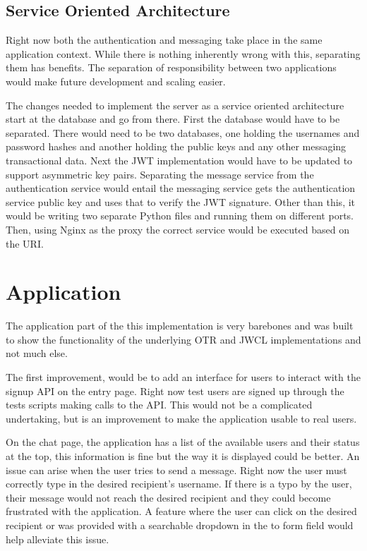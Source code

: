 \subsection{Service Oriented Architecture}


Right now both the authentication and messaging take place in the same application context. While there is nothing inherently wrong with this, separating them has benefits. The separation of responsibility between two applications would make future development and scaling easier. 


The changes needed to implement the server as a service oriented architecture start at the database and go from there. First the database would have to be separated. There would need to be two databases, one holding the usernames and password hashes and another holding the public keys and any other messaging transactional data. Next the JWT implementation would have to be updated to support asymmetric key pairs. Separating the message service from the authentication service would entail the messaging service gets the authentication service public key and uses that to verify the JWT signature. Other than this, it would be writing two separate Python files and running them on different ports. Then, using Nginx as the proxy the correct service would be executed based on the URI. 


\section{Application}


The application part of the this implementation is very barebones and was built to show the functionality of the underlying OTR and JWCL implementations and not much else. 


The first improvement, would be to add an interface for users to interact with the signup API on the entry page. Right now test users are signed up through the tests scripts making calls to the API. This would not be a complicated undertaking, but is an improvement to make the application usable to real users.


On the chat page, the application has a list of the available users and their status at the top, this information is fine but the way it is displayed could be better. An issue can arise when the user tries to send a message. Right now the user must correctly type in the desired recipient's username. If there is a typo by the user, their message would not reach the desired recipient and they could become frustrated with the application. A feature where the user can click on the desired recipient or was provided with a searchable dropdown in the to form field would help alleviate this issue.


